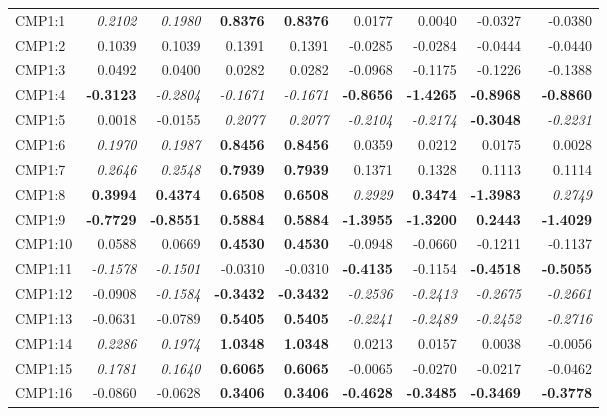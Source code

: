 \documentclass[review]{elsarticle}
\begin{document}
\begin{center}
\begin{longtable}{lrrrrrrrr}
CMP1:1 & \textit{0.2102} &\textit{0.1980}& \textbf{0.8376} & \textbf{0.8376} & 0.0177 & 0.0040 & -0.0327 & -0.0380\\
CMP1:2 & 0.1039 & 0.1039 & 0.1391 & 0.1391 & -0.0285 & -0.0284 & -0.0444 & -0.0440 \\
CMP1:3 & 0.0492 & 0.0400 & 0.0282 & 0.0282 & -0.0968 & -0.1175 & -0.1226 & -0.1388 \\
CMP1:4 & \textbf{-0.3123} & \textit{-0.2804} & \textit{-0.1671} & \textit{-0.1671} & \textbf{-0.8656} & \textbf{-1.4265} & \textbf{-0.8968} & \textbf{-0.8860}\\
CMP1:5 & 0.0018 & -0.0155 & \textit{0.2077} & \textit{0.2077} & \textit{-0.2104} & \textit{-0.2174} & \textbf{-0.3048} & \textit{-0.2231}\\
CMP1:6 & \textit{0.1970} & \textit{0.1987} & \textbf{0.8456} & \textbf{0.8456} & 0.0359 & 0.0212 & 0.0175 & 0.0028 \\
CMP1:7 & \textit{0.2646} & \textit{0.2548} & \textbf{0.7939} & \textbf{0.7939} & 0.1371 & 0.1328 & 0.1113 & 0.1114 \\
CMP1:8 & \textbf{0.3994} & \textbf{0.4374} & \textbf{0.6508} & \textbf{0.6508} & \textit{0.2929} & \textbf{0.3474} & \textbf{-1.3983} & \textit{0.2749}\\
CMP1:9 & \textbf{-0.7729} & \textbf{-0.8551} & \textbf{0.5884} & \textbf{0.5884} & \textbf{-1.3955} & \textbf{-1.3200} & \textbf{0.2443} & \textbf{-1.4029}\\
CMP1:10 & 0.0588 &  0.0669 & \textbf{0.4530} & \textbf{0.4530} & -0.0948 & -0.0660 & -0.1211 & -0.1137\\
CMP1:11 & \textit{-0.1578} & \textit{-0.1501} & -0.0310 & -0.0310 & \textbf{-0.4135} & -0.1154 & \textbf{-0.4518} & \textbf{-0.5055}\\
CMP1:12 & -0.0908 & \textit{-0.1584} & \textbf{-0.3432} & \textbf{-0.3432} & \textit{-0.2536} & \textit{-0.2413} & \textit{-0.2675} & \textit{-0.2661}\\
CMP1:13 & -0.0631 & -0.0789 & \textbf{0.5405} & \textbf{0.5405} & \textit{-0.2241} & \textit{-0.2489} & \textit{-0.2452} & \textit{-0.2716}\\
CMP1:14 & \textit{0.2286} & \textit{0.1974} & \textbf{1.0348} & \textbf{1.0348} & 0.0213 & 0.0157 & 0.0038 & -0.0056\\
CMP1:15 & \textit{0.1781} & \textit{0.1640} & \textbf{0.6065} & \textbf{0.6065} & -0.0065 & -0.0270 & -0.0217 & -0.0462\\
CMP1:16 & -0.0860 & -0.0628 & \textbf{0.3406} & \textbf{0.3406} & \textbf{-0.4628} & \textbf{-0.3485} & \textbf{-0.3469} &\ \textbf{-0.3778}\\

\end{longtable}
\end{center}
\end{document}
